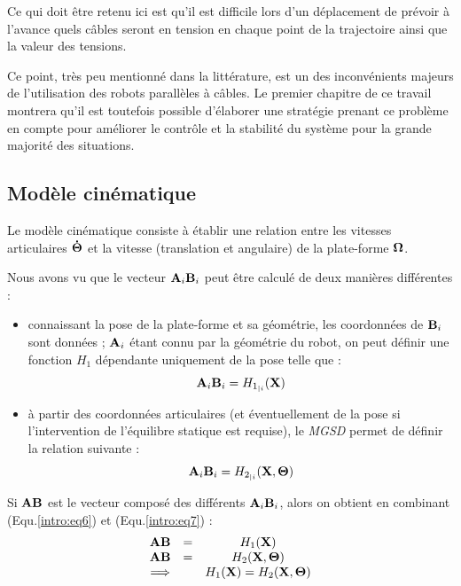 Ce qui doit \^etre retenu ici est qu'il est difficile lors d'un déplacement de 
prévoir à l'avance quels câbles seront en tension en chaque point de la 
trajectoire ainsi que la valeur des tensions.

Ce point, très peu mentionné dans la littérature, est un des inconvénients 
majeurs de l'utilisation des robots parallèles à câbles. Le premier chapitre de 
ce travail montrera qu'il est toutefois possible d'élaborer une stratégie 
prenant ce problème en compte pour améliorer le contrôle et la stabilité du 
système pour la grande majorité des situations.

\subsection{Modèle cinématique}\label{chap0-2-5}

Le modèle cinématique consiste à établir une relation entre les 
vitesses articulaires ${\bf \dot \Theta}$ et la vitesse (translation et 
angulaire) de la plate-forme $\bf \Omega$.

Nous avons vu que le vecteur ${\bf A}_i{\bf B}_i$ peut être calculé de deux 
manières différentes :
\begin{itemize}
 \item connaissant la pose de la plate-forme et sa géométrie, les coordonnées 
de 
${\bf B}_i$ sont données ; ${\bf A}_i$ étant connu par la géométrie du robot, 
on 
peut définir une fonction $H_1$ dépendante uniquement de la pose telle que :
\begin{equation}
{\bf A}_i{\bf B}_i = H_{1_{|i}}({\bf X})
\label{intro:eq6}
\end{equation}
 \item à partir des coordonnées articulaires (et éventuellement de la pose si 
l'intervention de l'équilibre statique est requise), le {\it MGSD} permet de 
définir la relation suivante :
\begin{equation}
{\bf A}_i{\bf B}_i = H_{2_{|i}}({\bf X}, {\bf \Theta})
\label{intro:eq7}
\end{equation}
\end{itemize}
 
Si ${\bf AB}$ est le vecteur composé des différents ${\bf A}_i{\bf B}_i$, alors 
on obtient en combinant (Equ.\ref{intro:eq6}) et (Equ.\ref{intro:eq7}) :
\begin{equation}
\begin{matrix}
{\bf AB} &=& H_1({\bf X}) \\
{\bf AB} &=& H_2({\bf X}, {\bf \Theta}) \\
\Longrightarrow & & H_1({\bf X}) = H_2({\bf X}, {\bf \Theta})
\end{matrix}
\label{intro:eq8}
\end{equation}

